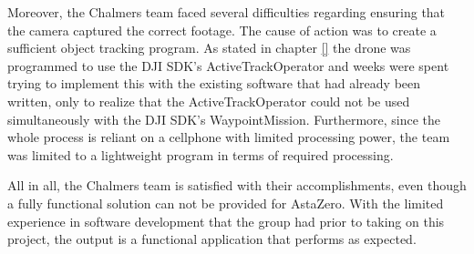 Moreover, the Chalmers team faced several difficulties regarding ensuring that the camera captured the correct footage. The cause of action was to create a sufficient object tracking program. As stated in chapter \ref{}  the drone was programmed to use the DJI SDK's ActiveTrackOperator and weeks were spent trying to implement this with the existing software that had already been written, only to realize that the ActiveTrackOperator could not be used simultaneously with the DJI SDK's WaypointMission. Furthermore, since the whole process is reliant on a cellphone with limited processing power, the team was limited to a lightweight program in terms of required processing. 

All in all, the Chalmers team is satisfied with their accomplishments, even though a fully functional solution can not be provided for AstaZero. With the limited experience in software development that the group had prior to taking on this project, the output is a functional application that performs as expected.




